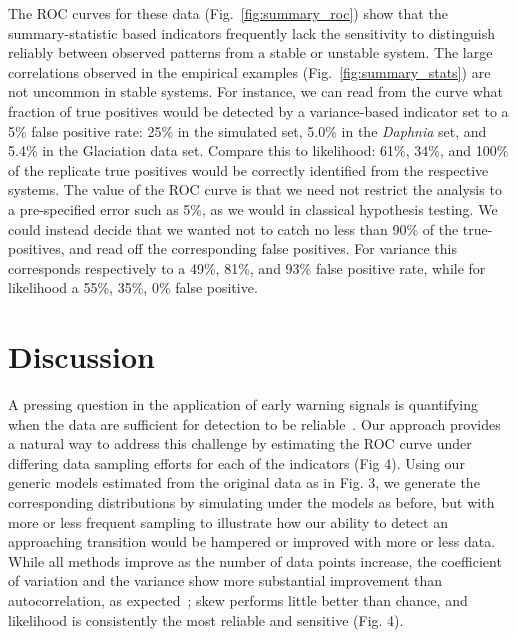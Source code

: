 \documentclass[authoryear,review,11pt]{elsarticle}
\begin{document}
 The ROC curves for these data (Fig.~\ref{fig:summary_roc}) show that the summary-statistic based indicators 
frequently lack the sensitivity to distinguish reliably between observed patterns from a stable or unstable system. 
The large correlations observed in the empirical examples (Fig.~\ref{fig:summary_stats}) are not uncommon in stable systems. 
For instance, we can read from the curve what fraction of true positives would be detected by a variance-based indicator
set to a 5\% false positive rate:
25\% in the simulated set,
5.0\% in the \emph{Daphnia} set,
and 5.4\% in the Glaciation data set.
Compare this to likelihood: 61\%, 34\%, and 100\% of the replicate true positives
would be correctly identified from the respective systems.
The value of the ROC curve is that we need not restrict the analysis to a pre-specified error such as 5\%,
as we would in classical hypothesis testing.  
We could instead decide that we wanted not to catch no less than 90\% of the true-positives,
and read off the corresponding false positives.  
For variance this corresponds respectively to a 49\%, 81\%, and 93\% false positive rate,
while for likelihood a 55\%, 35\%, 0\% false positive.



\section{Discussion}
A pressing question in the application of early warning signals is quantifying
when the data are sufficient for detection to be reliable~\citep{Scheffer2009, Scheffer2010, Inman2011}. 
Our approach provides a natural way to address this challenge by estimating the ROC curve under differing data sampling efforts
for each of the indicators (Fig 4). 
Using our generic models estimated from the original data as in Fig. 3, 
we generate the corresponding distributions by simulating under the models as before, 
but with more or less frequent sampling to illustrate how our ability to detect an approaching transition 
would be hampered or improved with more or less data.  
While all methods improve as the number of data points increase, 
the coefficient of variation and the variance show more substantial improvement than autocorrelation, 
as expected~\citep{Carpenter2011};⁠
skew performs little better than chance, and likelihood is consistently the most reliable and sensitive (Fig. 4). 
\end{document}
